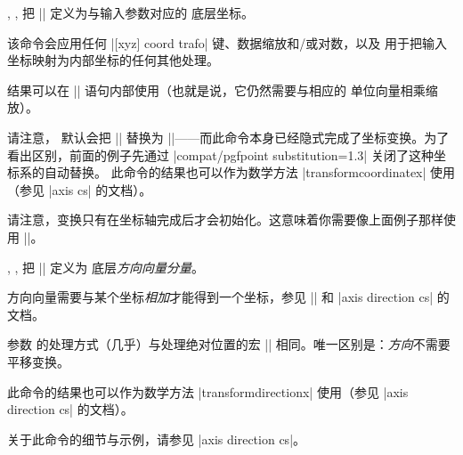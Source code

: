 \begin{commandlist}{%
    \pgfplotstransformcoordinatex{},
    \pgfplotstransformcoordinatey{},
    \pgfplotstransformcoordinatez{}%
}
    把 |\pgfmathresult| 定义为与输入参数对应的 \PGF{} 底层坐标。

    该命令会应用任何 |[xyz] coord trafo| 键、数据缩放和/或对数，以及 \PGFPlots{} 用于把输入坐标映射为内部坐标的任何其他处理。

    结果可以在 |\pgfpointxy| 语句内部使用（也就是说，它仍然需要与相应的 \PGF{} 单位向量相乘缩放）。
\begin{codeexample}[]
\end{codeexample}
    请注意，\PGFPlots{} 默认会把 |\pgfqpointxy| 替换为 |\pgfplotspointaxisxyz|——而此命令本身已经隐式完成了坐标变换。为了看出区别，前面的例子先通过
    |compat/pgfpoint substitution=1.3| 关闭了这种坐标系的自动替换。
    此命令的结果也可以作为数学方法
    |transformcoordinatex| 使用（参见 |axis cs| 的文档）。

    请注意，变换只有在坐标轴完成后才会初始化。这意味着你需要像上面例子那样使用 |\pgfplotsextra|。
\end{commandlist}

\begin{commandlist}{%
    \pgfplotstransformdirectionx{},
    \pgfplotstransformdirectiony{},
    \pgfplotstransformdirectionz{}%
}
    把 |\pgfmathresult| 定义为 \PGF{} 底层\emph{方向向量分量}。

    方向向量需要与某个坐标\emph{相加}才能得到一个坐标，参见
    |\pgfplotspointaxisdirectionxy| 和 |axis direction cs| 的文档。

    参数  的处理方式（几乎）与处理绝对位置的宏
    |\pgfplotstransformcoordinatex| 相同。唯一区别是：\emph{方向}不需要平移变换。

    此命令的结果也可以作为数学方法
    |transformdirectionx| 使用（参见 |axis direction cs| 的文档）。

    关于此命令的细节与示例，请参见 |axis direction cs|。
\end{commandlist}

